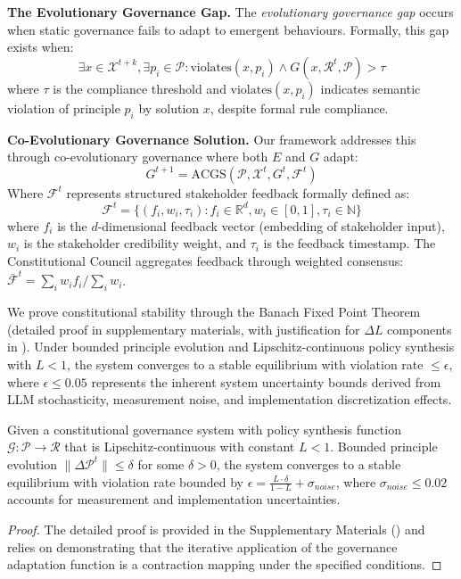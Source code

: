 \documentclass[manuscript,screen,review,anonymous,9pt]{acmart}
\begin{document}
\textbf{The Evolutionary Governance Gap.} The \textit{evolutionary governance gap} occurs when static governance fails to adapt to emergent behaviours. Formally, this gap exists when:
\[\exists x \in \mathcal{X}^{t+k}, \exists p_i \in \mathcal{P}: \text{violates}(x, p_i) \land G(x, \mathcal{R}^t, \mathcal{P}) > \tau\]
where $\tau$ is the compliance threshold and $\text{violates}(x, p_i)$ indicates semantic violation of principle $p_i$ by solution $x$, despite formal rule compliance.

\textbf{Co-Evolutionary Governance Solution.} Our framework addresses this through co-evolutionary governance where both $E$ and $G$ adapt:
\[G^{t+1} = \text{ACGS}(\mathcal{P}, \mathcal{X}^t, G^t, \mathcal{F}^t)\]
Where $\mathcal{F}^t$ represents structured stakeholder feedback formally defined as:
\[\mathcal{F}^t = \{(f_i, w_i, \tau_i) : f_i \in \mathbb{R}^d, w_i \in [0,1], \tau_i \in \mathbb{N}\}\]
where $f_i$ is the $d$-dimensional feedback vector (embedding of stakeholder input), $w_i$ is the stakeholder credibility weight, and $\tau_i$ is the feedback timestamp. The Constitutional Council aggregates feedback through weighted consensus: $\bar{\mathcal{F}}^t = \sum_{i} w_i f_i / \sum_{i} w_i$.

We prove constitutional stability through the Banach Fixed Point Theorem (detailed proof in supplementary materials, with justification for $\Delta L$ components in ). Under bounded principle evolution and Lipschitz-continuous policy synthesis with $L < 1$, the system converges to a stable equilibrium with violation rate $\leq \epsilon$, where $\epsilon \leq 0.05$ represents the inherent system uncertainty bounds derived from LLM stochasticity, measurement noise, and implementation discretization effects.

\begin{theorem}
	\label{thm:constitutional_stability}
	Given a constitutional governance system with policy synthesis function $\mathcal{G}: \mathcal{P} \rightarrow \mathcal{R}$ that is Lipschitz-continuous with constant $L < 1$. Bounded principle evolution $\|\Delta \mathcal{P}^t\| \leq \delta$ for some $\delta > 0$, the system converges to a stable equilibrium with violation rate bounded by $\epsilon = \frac{L \cdot \delta}{1-L} + \sigma_{noise}$, where $\sigma_{noise} \leq 0.02$ accounts for measurement and implementation uncertainties.
\end{theorem}
\begin{proof}
	The detailed proof is provided in the Supplementary Materials () and relies on demonstrating that the iterative application of the governance adaptation function is a contraction mapping under the specified conditions.
\end{proof}
\end{document}
